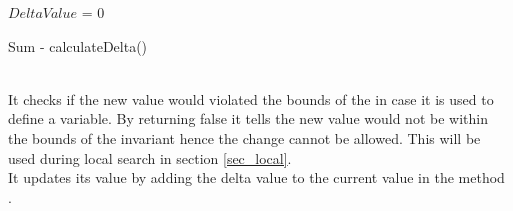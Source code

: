 \IncMargin{1em}
\begin{algorithm}[H]

  \algdata
{}
    \int $DeltaValue$ = 0 \;
     {
        \Return \false\;
    }\Else{
    \Return \true \;
    }
\caption{Sum - calculateDelta()} \label{algo_calcDelta} 
\end{algorithm} \noindent
\DecMargin{1em} \\
It checks if the new value would violated the bounds of the  in case it is used to define a variable. 
By returning false it tells the new value would not be within the bounds of the invariant hence the change cannot be 
allowed. This will 
be used during local search in section \ref{sec_local}. \\
It updates its value by adding the delta value to the current value in the method .

